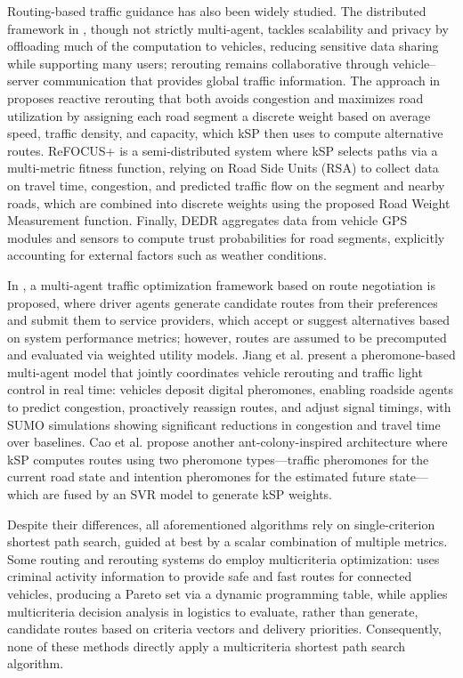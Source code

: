 \documentclass[sigconf]{aamas}
\begin{document}
Routing-based traffic guidance has also been widely studied. The distributed framework in \cite{DIVERT}, though not strictly multi-agent, tackles scalability and privacy by offloading much of the computation to vehicles, reducing sensitive data sharing while supporting many users; rerouting remains collaborative through vehicle–server communication that provides global traffic information. The approach in \cite{utilization} proposes reactive rerouting that both avoids congestion and maximizes road utilization by assigning each road segment a discrete weight based on average speed, traffic density, and capacity, which kSP then uses to compute alternative routes. ReFOCUS+ \cite{ReFOCUS} is a semi-distributed system where kSP selects paths via a multi-metric fitness function, relying on Road Side Units (RSA) to collect data on travel time, congestion, and predicted traffic flow on the segment and nearby roads, which are combined into discrete weights using the proposed Road Weight Measurement function. Finally, DEDR \cite{DEDR} aggregates data from vehicle GPS modules and sensors to compute trust probabilities for road segments, explicitly accounting for external factors such as weather conditions.

In \cite{CTMRGS}, a multi-agent traffic optimization framework based on route negotiation is proposed, where driver agents generate candidate routes from their preferences and submit them to service providers, which accept or suggest alternatives based on system performance metrics; however, routes are assumed to be precomputed and evaluated via weighted utility models. Jiang et al. \cite{pheromone} present a pheromone-based multi-agent model that jointly coordinates vehicle rerouting and traffic light control in real time: vehicles deposit digital pheromones, enabling roadside agents to predict congestion, proactively reassign routes, and adjust signal timings, with SUMO simulations showing significant reductions in congestion and travel time over baselines. Cao et al. \cite{AntColony} propose another ant-colony-inspired architecture where kSP computes routes using two pheromone types—traffic pheromones for the current road state and intention pheromones for the estimated future state—which are fused by an SVR model to generate kSP weights.

Despite their differences, all aforementioned algorithms rely on single-criterion shortest path search, guided at best by a scalar combination of multiple metrics. Some routing and rerouting systems do employ multicriteria optimization: \cite{DP_Criminal} uses criminal activity information to provide safe and fast routes for connected vehicles, producing a Pareto set via a dynamic programming table, while \cite{VIKOR} applies multicriteria decision analysis \cite{MCDA} in logistics to evaluate, rather than generate, candidate routes based on criteria vectors and delivery priorities. Consequently, none of these methods directly apply a multicriteria shortest path search algorithm.
\end{document}
